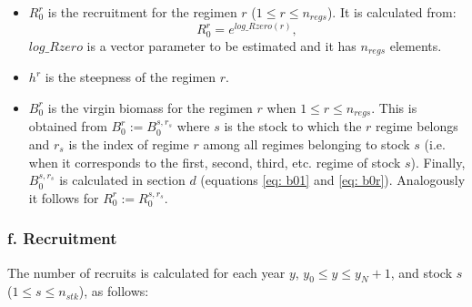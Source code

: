 \documentclass{article}
\begin{document}
\begin{itemize}

\item $R^{r}_0$ is the recruitment for the regimen $r$ ($1\leq r \leq n_{regs}$). It is calculated from: 
\begin{equation}
    R^r_0=e^{log\_Rzero(r)},
\end{equation}
$log\_Rzero$ is a vector parameter to be estimated and it has $n_{regs}$ elements.
\item $h^{r}$ is the steepness of the regimen $r$.

\item $B^{r}_0$ is the virgin biomass for the regimen $r$ when $1\leq r \leq n_{regs}$. This is obtained from $B^{r}_0:=B^{s,r_s}_0$ where $s$ is the stock to which the $r$ regime belongs and $r_s$ is the index of regime $r$ among all regimes belonging to stock $s$ (i.e. when it corresponds to the first, second, third, etc. regime of stock $s$). Finally, $B^{s,r_s}_0$ is calculated in section $d$ (equations \ref{eq: b01} and \ref{eq: b0r}). Analogously it follows for $R^{r}_0 := R^{s,r_s}_0$.



\end{itemize}

\hfill

\subsubsection{f. Recruitment} \label{ch: recruitment}

The number of recruits is calculated for each year $y$, $y_0\leq y \leq y_N+1$, and stock $s$ ($1\leq s \leq n_{stk}$), as follows:
\end{document}
